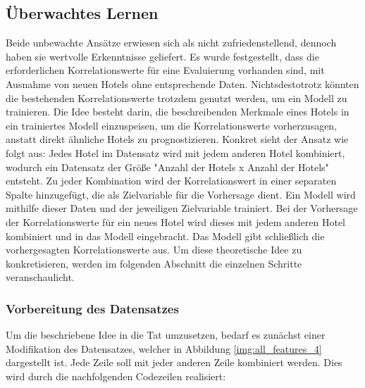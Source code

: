\subsection{Überwachtes Lernen}
\label{subsec:lean}
Beide unbewachte Ansätze erwiesen sich als nicht zufriedenstellend, dennoch haben sie wertvolle Erkenntnisse geliefert. Es wurde festgestellt, dass die erforderlichen Korrelationswerte für eine Evaluierung vorhanden sind, mit Ausnahme von neuen Hotels ohne entsprechende Daten. Nichtsdestotrotz könnten die bestehenden Korrelationswerte trotzdem genutzt werden, um ein Modell zu trainieren. Die Idee besteht darin, die beschreibenden Merkmale eines Hotels in ein trainiertes Modell einzuspeisen, um die Korrelationswerte vorherzusagen, anstatt direkt ähnliche Hotels zu prognostizieren.
\newline
\newline
Konkret sieht der Ansatz wie folgt aus: Jedes Hotel im Datensatz wird mit jedem anderen Hotel kombiniert, wodurch ein Datensatz der Größe "Anzahl der Hotels x Anzahl der Hotels" entsteht. Zu jeder Kombination wird der Korrelationswert in einer separaten Spalte hinzugefügt, die als Zielvariable für die Vorhersage dient. Ein Modell wird mithilfe dieser Daten und der jeweiligen Zielvariable trainiert. Bei der Vorhersage der Korrelationswerte für ein neues Hotel wird dieses mit jedem anderen Hotel kombiniert und in das Modell eingebracht. Das Modell gibt schließlich die vorhergesagten Korrelationswerte aus.
\newline
\newline
Um diese theoretische Idee zu konkretisieren, werden im folgenden Abschnitt die einzelnen Schritte veranschaulicht.

\subsubsection{Vorbereitung des Datensatzes}
\label{subsubsec:learn_prepare}
Um die beschriebene Idee in die Tat umzusetzen, bedarf es zunächst einer Modifikation des Datensatzes, welcher in Abbildung \ref{img:all_features_4} dargestellt ist. Jede Zeile soll mit jeder anderen Zeile kombiniert werden. Dies wird durch die nachfolgenden Codezeilen realisiert:

